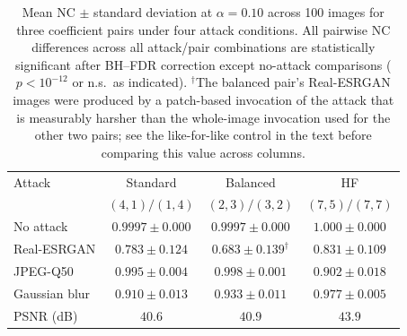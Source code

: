 \documentclass[conference]{IEEEtran}
\begin{document}
\begin{table}[t]
\caption{Mean NC $\pm$ standard deviation at $\alpha=0.10$ across 100
images for three coefficient pairs under four attack conditions.
All pairwise NC differences across all attack/pair combinations are
statistically significant after BH--FDR correction except no-attack
comparisons ($p < 10^{-12}$ or n.s.\ as indicated). $^\dagger$The
balanced pair's Real-ESRGAN images were produced by a patch-based
invocation of the attack that is measurably harsher than the whole-image
invocation used for the other two pairs; see the like-for-like control
in the text before comparing this value across columns.}
\label{tab:pairs}
\centering
\begin{tabular}{lccc}
\toprule
Attack & Standard & Balanced & HF \\
       & $(4,1)/(1,4)$ & $(2,3)/(3,2)$ & $(7,5)/(7,7)$ \\
\midrule
No attack      & $0.9997 \pm 0.000$ & $0.9997 \pm 0.000$ & $1.000 \pm 0.000$ \\
Real-ESRGAN    & $0.783 \pm 0.124$ & $0.683 \pm 0.139^\dagger$   & $0.831 \pm 0.109$ \\
JPEG-Q50       & $0.995 \pm 0.004$ & $0.998 \pm 0.001$   & $0.902 \pm 0.018$ \\
Gaussian blur  & $0.910 \pm 0.013$ & $0.933 \pm 0.011$   & $0.977 \pm 0.005$ \\
\midrule
PSNR (dB)      & $40.6$ & $40.9$ & $43.9$ \\
\bottomrule
\end{tabular}
\end{table}
\end{document}
